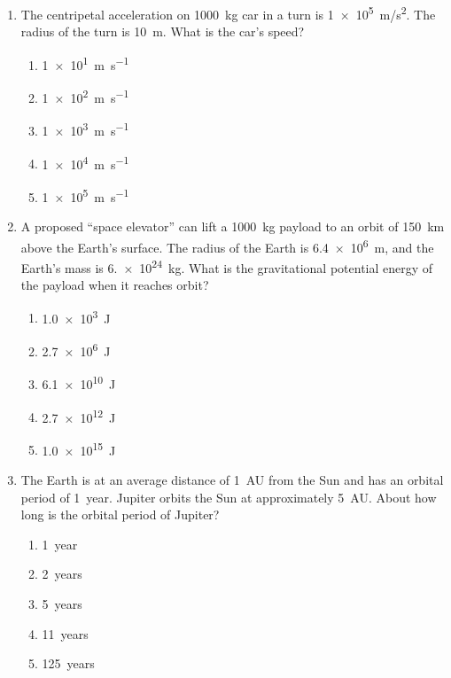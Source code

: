 \documentclass{../../oss-apphys}
\begin{document}
\begin{multicols}{2}
\begin{enumerate}[leftmargin=18pt]
  \item The centripetal acceleration on \SI{1000}{\kilo\gram} car in a turn is
    \SI{1e5}{m/s^2}. The radius of the turn is \SI{10}{\metre}. What is the
    car's speed?
    \begin{enumerate}[noitemsep,topsep=0pt,leftmargin=18pt,label=(\Alph*)]
    \item\SI{1e1}{\metre\per\second}
    \item\SI{1e2}{\metre\per\second}
    \item\SI{1e3}{\metre\per\second}
    \item\SI{1e4}{\metre\per\second}
    \item\SI{1e5}{\metre\per\second}
    \end{enumerate}

    \columnbreak
    
  \item A proposed ``space elevator'' can lift a \SI{1000}{\kilo\gram} payload
    to an orbit of \SI{150}{\kilo\metre} above the Earth's surface. The radius
    of the Earth is \SI{6.4e6}{\metre}, and the Earth's mass is
    \SI{6.e24}{\kilo\gram}. What is the gravitational potential energy of the
    payload when it reaches orbit?
    \begin{enumerate}[noitemsep,topsep=0pt,leftmargin=18pt,label=(\Alph*)]
    \item\SI{1.0e3}{\joule}
    \item\SI{2.7e6}{\joule}
    \item\SI{6.1e10}{\joule}
    \item\SI{2.7e12}{\joule}
    \item\SI{1.0e15}{\joule}
    \end{enumerate}

  \item The Earth is at an average distance of \SI{1}{AU} from the Sun and has
    an orbital period of \SI{1}{year}. Jupiter orbits the Sun at approximately
    \SI{5}{AU}. About how long is the orbital period of Jupiter?
    \begin{enumerate}[noitemsep,topsep=0pt,leftmargin=18pt,label=(\Alph*)]
    \item\SI{1}{year}
    \item\SI{2}{years}
    \item\SI{5}{years}
    \item\SI{11}{years}
    \item\SI{125}{years}
    \end{enumerate}


\end{enumerate}
\end{multicols}
\end{document}
